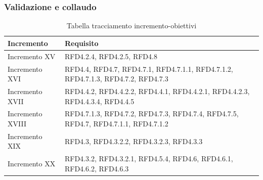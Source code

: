 \documentclass[../piano_di_progetto.tex]{subfiles}
\begin{document}
\subsubsection*{Validazione e collaudo}
\begin{table}[!h]
	\centering
	\begin{tabular}{|p{3cm}|p{6.5cm}|}
	\hline
	\rowcolor{lightgray}
    \textbf{Incremento} & \textbf{Requisito}\\
    \hline
        Incremento XV & RFD4.2.4, RFD4.2.5, RFD4.8 \\
        Incremento XVI & RFD4.4, RFD4.7, RFD4.7.1, RFD4.7.1.1, RFD4.7.1.2, RFD4.7.1.3, RFD4.7.2, RFD4.7.3 \\
        Incremento XVII & RFD4.4.2, RFD4.4.2.2, RFD4.4.1, RFD4.4.2.1, RFD4.4.2.3, RFD4.4.3.4, RFD4.4.5 \\
        Incremento XVIII & RFD4.7.1.3, RFD4.7.2, RFD4.7.3, RFD4.7.4, RFD4.7.5, RFD4.7, RFD4.7.1.1, RFD4.7.1.2 \\
        Incremento XIX & RFD4.3, RFD4.3.2.2, RFD4.3.2.3, RFD4.3.3 \\
        Incremento XX & RFD4.3.2, RFD4.3.2.1, RFD4.5.4, RFD4.6, RFD4.6.1, RFD4.6.2, RFD4.6.3 \\	   
    \hline	
	\end{tabular}
	\caption{Tabella tracciamento incremento-obiettivi}
\end{table}
\end{document}

